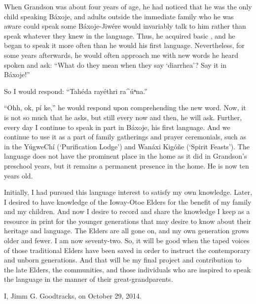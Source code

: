 \documentclass[output=paper]{LSP/langsci}
\begin{document}
When Grandson was about four years of age, he had noticed that he was the only child speaking Báxoje, and adults outside the immediate family who he was aware could speak some Báxoje-Jiwére would invariably talk  to him rather than speak whatever they knew in the language. Thus, he acquired basic , and he began to speak it more often than he would his first language. Nevertheless, for some years afterwards, he would often approach me with new  words he heard spoken and ask: ``What do they mean when they say `diarrhea'? Say it in Báxoje!''

So I would respond: ``Tahéda rayéthri ra\^{ }úⁿna.''
	
``Ohh, ok, pí ke,'' he would respond upon comprehending the new word. Now, it is not so much that he asks, but still every now and then, he will ask. Further, every day I continue to speak in part in Báxoje, his first language. And we continue to use it as a part of family gatherings and prayer ceremonials, such as in the YúgweChí (`Purification Lodge') and Wanáxi Kigóñe (`Spirit Feasts'). The language does not have the prominent place in the home as it did in Grandson's preschool years, but it remains a permanent presence in the home. He is now ten years old.

Initially, I had pursued this language interest to satisfy my own knowledge. Later, I desired to have knowledge of the Ioway-Otoe Elders for the benefit of my family and my children. And now I desire to record and share the knowledge I keep as a resource in print for the younger generations that may desire to know about their heritage and language. The Elders are all gone on, and my own generation grows older and fewer. I am now seventy-two. So, it will be good when the taped voices of those traditional Elders have been saved in order to instruct the contemporary and unborn generations. And that will be my final project and contribution to the late Elders, the communities, and those individuals who are inspired to speak the language in the manner of their great-grandparents.

I, Jimm G. Goodtracks, on October 29, 2014.
\end{document}
